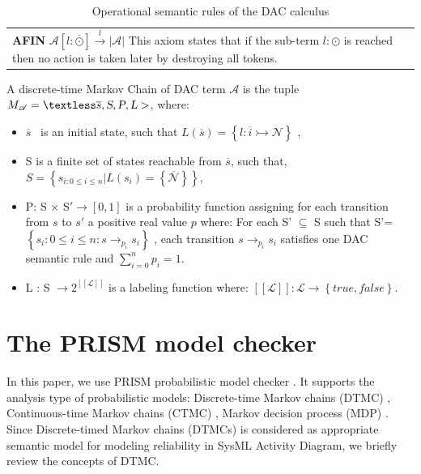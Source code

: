 \documentclass[3p,times,procedia,authoryear,round]{elsarticle}
\begin{document}
\begin{table}[ht]
\begin{center}
\begin{tabular}{ m{7cm} m{7cm} }
			\\

		
			\textbf{AFIN}  $ \mathcal{A}[l:\overline{\mathcal{\odot}}] \stackrel{l}{\rightarrow} |\mathcal{A}|$
			This axiom states that if the sub-term $l : \odot$  is reached then no action is taken later by destroying all tokens.
			&

			\\	
		\end{tabular}
	\end{center}
	\caption{Operational semantic rules of the DAC calculus}
	\label{op}
\end{table}













\begin{mydef}\label{def2} A discrete-time  Markov Chain of DAC term $\mathscr{A}$ is the tuple $M_{\mathscr{A}} = \textless \overline{s} , \textsl{S}, \textsl{P}, \textsl{L}  >$, where:

\begin{itemize}
	\item $\overline{s} $ \ is an initial state, such that $ L(\overline{s}) = \left\{l: \overline{i} \rightarrowtail \mathcal{N} \right\}$ ,
	\item S is a finite set of states reachable from $\overline{s} $, such that, $S =\left\{s_{i:0\leq i\leq n}| L(s_{i})=\left\{ \overline{\mathcal{N}}\right\} \right\} $,

\item	P: S $  \times$ S$'\rightarrow [ 0, 1] $ is a probability function assigning for each  transition from $ s$ to $s' $  a  positive real value $ p$ where:  For each S' $\subseteq$ S such that S'=$\left\{s_{i}:0\leq i \leq n:s\rightarrow_{p_{i}} s_{i} \right\}$ , each transition $s\rightarrow_{p_{i}} s_{i}$  satisfies one DAC semantic rule and  $\sum^{n}_{i=0} p_{i}= 1$.

	
	\item L : S $\rightarrow 2^{[[\mathcal{L}]]}$ is a labeling function where: $[[\mathcal{L}]] : \mathcal{L} \rightarrow \left\{true, false\right\}$.
\end{itemize}

\end{mydef}
  

\section{The PRISM model checker}
\label{section5}
In this paper, we use PRISM probabilistic model checker \citep{Kwiatkowska}. It supports the analysis type of probabilistic models: Discrete-time Markov chains (DTMC) \citep{KP12}, Continuous-time Markov chains (CTMC) \citep{KNP07a}, Markov decision process (MDP) \citep{Forejt2011}.  Since Discrete-timed Markov chains (DTMCs) is considered as appropriate semantic model for modeling reliability \citep{Franco2016} in SysML Activity Diagram, we briefly review the concepts of DTMC. 
\end{document}
